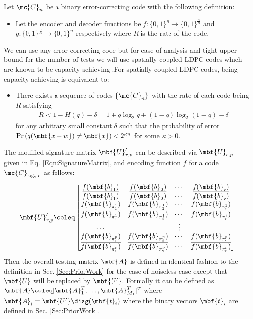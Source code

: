 \documentclass[conference,twocolumn]{IEEEtran}
\begin{document}
Let $\mc{C}_n$ be a binary error-correcting code with the following definition:
\begin{itemize}
\item Let the encoder and decoder functions be $f:\{0,1\}^{n}\rightarrow \{0,1\}^{\frac{n}{R}}$ and $g:\{0,1\}^{\frac{n}{R}}\rightarrow \{0,1\}^{n}$ respectively where $R$ is the rate of the code.
\end{itemize}
We can use any error-correcting code but for ease of analysis and tight upper bound for the number of tests we will use spatially-coupled LDPC codes which are known to be capacity achieving \cite{kumar2014threshold,kudekar2013spatially}.For spatially-coupled LDPC codes, being capacity achieving is equivalent to: 
\begin{itemize}
\item There exists a sequence of codes $\{\mc{C}_n\}$ with the rate of each code being $R$ satisfying 
\begin{align}
\label{Eqn:ProbErrorCoding}
R<1-H(q)-\delta=1+q\log_2 q+(1-q)\log_2(1-q)-\delta
\end{align}
for any arbitrary small constant $\delta$ such that the probability of error $\text{Pr}\left(g(\mbf{x+w})\neq \mbf{x}\right)<2^{\kappa n}$ for some $\kappa >0$.
\end{itemize} 
The modified signature matrix $\mbf{U}'_{r,p}$ can be described via $\mbf{U}_{r, p}$ given in Eq. \eqref{Eqn:SignatureMatrix}, and encoding function $f$ for a code $\mc{C}_{\log_2 r}$ as follows:
 \begin{align}
\label{Eqn:SignatureMatrixModified}
\mbf{U}_{r,p}'\coleq\begin{bmatrix}
f(\mbf{b}_1)  & f(\mbf{b}_2) &\cdots & f(\mbf{b}_r) \\
\overline{f(\mbf{b}_1)} & \overline{f(\mbf{b}_2)} & \cdots & \overline{f(\mbf{b}_r)}\\
f(\mbf{b}_{\pi^{1}_{1}}) & f(\mbf{b}_{\pi^{1}_{2}}) & \cdots & f(\mbf{b}_{\pi^{1}_{r}})\\
\overline{f(\mbf{b}_{\pi^{1}_{1}})} & \overline{f(\mbf{b}_{\pi^{1}_{2}})} & \cdots & \overline{f(\mbf{b}_{\pi^{1}_{r}})}\\
\cdots &  &\vdots \\
f(\mbf{b}_{\pi^{p}_{1}}) & f(\mbf{b}_{\pi^{p}_{2}}) & \cdots & f(\mbf{b}_{\pi^{p}_{r}})\\
\overline{f(\mbf{b}_{\pi^{p}_{1}})} & \overline{f(\mbf{b}_{\pi^{p}_{2}})} & \cdots & \overline{f(\mbf{b}_{\pi^{p}_{r}})}\\
\end{bmatrix}
\end{align}  
Then the overall testing matrix $\mbf{A}$ is defined in identical fashion to the definition in Sec. \ref{Sec:PriorWork} for the case of noiseless case except that $\mbf{U}$ will be replaced by $\mbf{U'}$. Formally it can be defined as $\mbf{A}\coleq [\mbf{A}_{1}^{T},\ldots,\mbf{A}_{M_{1}}^{T}]^T$ where $\mbf{A}_{i}=\mbf{U'} \diag (\mbf{t}_i)$ where the binary vectors $\mbf{t}_i$ are defined in Sec. \ref{Sec:PriorWork}. 
\end{document}
